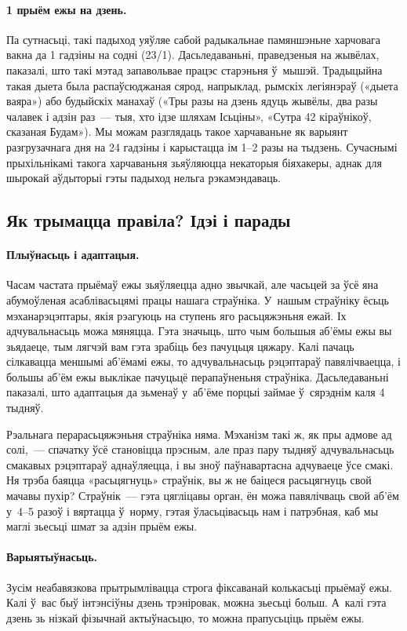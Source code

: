 \paragraph{1 прыём ежы на дзень.}
Па сутнасьці, такі падыход уяўляе сабой радыкальнае памяншэньне харчовага вакна да 1 гадзіны на содні (23/1). Дасьледаваньні, праведзеныя на жывёлах, паказалі, што такі мэтад запавольвае працэс старэньня ў~мышэй. Традыцыйна такая дыета была распаўсюджаная сярод, напрыклад, рымскіх легіянэраў («дыета ваяра») або будыйскіх манахаў («Тры разы на дзень ядуць жывёлы, два разы чалавек і адзін раз~--- тыя, хто ідзе шляхам Ісьціны», «Сутра 42 кіраўнікоў, сказаная Будам»). Мы можам разглядаць такое харчаваньне як варыянт разгрузачнага дня на 24 гадзіны і карыстацца ім 1--2 разы на тыдзень. Сучаснымі прыхільнікамі такога харчаваньня зьяўляюцца некаторыя біяхакеры, аднак для шырокай аўдыторыі гэты падыход нельга рэкамэндаваць.

\subsection{Як трымацца правіла? Ідэі і парады}

\paragraph{Плыўнасьць і адаптацыя.}
Часам частата прыёмаў ежы зьяўляецца адно звычкай, але часьцей за ўсё яна абумоўленая асаблівасьцямі працы нашага страўніка. У~нашым страўніку ёсьць мэханарэцэптары, якія рэагуюць на ступень яго расьцяжэньня ежай. Іх адчувальнасьць можа мяняцца. Гэта значыць, што чым большыя аб'ёмы ежы вы зьядаеце, тым лягчэй вам гэта зрабіць без пачуцьця цяжару. Калі пачаць сілкавацца меншымі аб'ёмамі ежы, то адчувальнасьць рэцэптараў павялічваецца, і большы аб'ём ежы выклікае пачуцьцё перапаўненьня страўніка. Дасьледаваньні паказалі, што адаптацыя да зьменаў у~аб'ёме порцыі займае ў~сярэднім каля 4 тыдняў.

Рэальнага перарасьцяжэньня страўніка няма. Мэханізм такі ж, як пры адмове ад солі,~--- спачатку ўсё становіцца прэсным, але праз пару тыдняў адчувальнасьць смакавых рэцэптараў аднаўляецца, і вы зноў паўнавартасна адчуваеце ўсе смакі. Ня трэба баяцца «расьцягнуць» страўнік, вы ж не баіцеся расьцягнуць свой мачавы пухір? Страўнік~--- гэта цягліцавы орган, ён можа павялічваць свой аб'ём у~4--5 разоў і вяртацца ў~норму, гэтая ўласьцівасьць нам і патрэбная, каб мы маглі зьесьці шмат за адзін прыём ежы.

\paragraph{Варыятыўнасьць.}
Зусім неабавязкова прытрымлівацца строга фіксаванай колькасьці прыёмаў ежы. Калі ў~вас быў інтэнсіўны дзень трэніровак, можна зьесьці больш. А~калі гэта дзень зь нізкай фізычнай актыўнасьцю, то можна прапусьціць прыём ежы.

